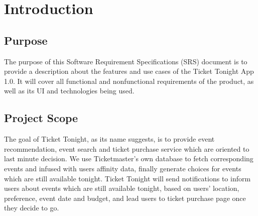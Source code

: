 \section{Introduction }
	\subsection{Purpose}
	  The purpose of this Software Requirement Specifications (SRS) document is to provide a description about the features and use cases of the Ticket Tonight App 1.0. It will cover all functional and nonfunctional requirements of the product, as well as its UI and technologies being used.
	\subsection{Project Scope}
	  The goal of Ticket Tonight, as its name suggests, is to provide event recommendation, event search and ticket purchase service which are oriented to last minute decision. We use Ticketmaster’s own database to fetch corresponding events and infused with users affinity data, finally generate choices for events which are still available tonight.  Ticket Tonight will send notifications to inform users about events which are still available tonight, based on users’ location, preference, event date and budget, and lead users to ticket purchase page once they decide to go. 